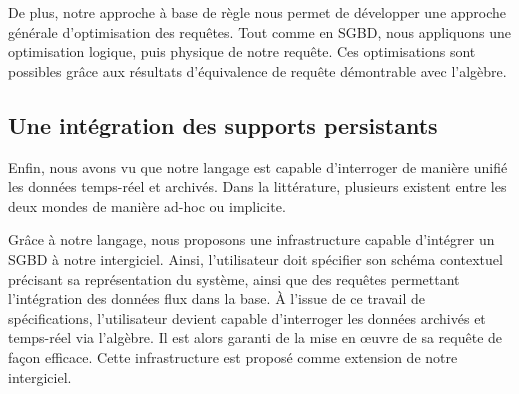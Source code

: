 De plus, notre approche à base de règle nous permet de développer une approche générale d'optimisation des requêtes. Tout comme en SGBD, nous appliquons une optimisation logique, puis physique de notre requête. Ces optimisations sont possibles grâce aux résultats d'équivalence de requête démontrable avec l'algèbre.

\subsection{Une intégration des supports persistants}
Enfin, nous avons vu que notre langage est capable d'interroger de manière unifié les données temps-réel et archivés. Dans la littérature, plusieurs existent entre les deux mondes de manière ad-hoc ou implicite.

Grâce à notre langage, nous proposons une infrastructure capable d'intégrer un SGBD à notre intergiciel. Ainsi, l'utilisateur doit spécifier son schéma contextuel précisant sa représentation du système, ainsi que des requêtes permettant l'intégration des données flux dans la base. À l'issue de ce travail de spécifications, l'utilisateur devient capable d'interroger les données archivés et temps-réel via l'algèbre. Il est alors garanti de la mise en œuvre de sa requête de façon efficace. Cette infrastructure est proposé comme extension de notre intergiciel.
